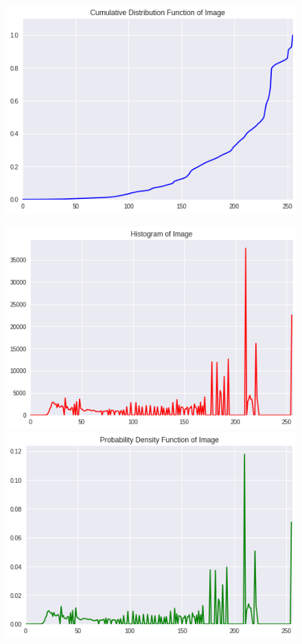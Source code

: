 \documentclass{article}
\begin{document}
\begin{enumerate}[label=B\arabic*)]
\begin{figure}[h!]
\begin{minipage}{0.32\textwidth}
				\includegraphics[width=0.9\linewidth]{Chino/Before/CDF.png}
			\end{minipage}
		\end{figure}
		\begin{figure}[h!]
			\begin{minipage}{0.32\textwidth}
				\centering
				\includegraphics[width=0.9\linewidth]{Chino/After/Hist.png}
			\end{minipage}
			\hfill
			\begin{minipage}{0.32\textwidth}
				\centering
				\includegraphics[width=0.9\linewidth]{Chino/After/PDF.png}

\end{minipage}
\end{figure}
\end{enumerate}
\end{document}
